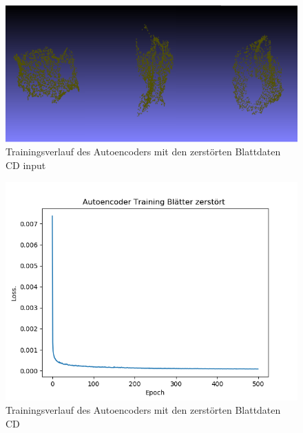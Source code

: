 \documentclass{llncs}
\begin{document}
\begin{figure}[htbp] 
	\centering
	\includegraphics[width=1.2\textwidth]{autoencoder_destroyed_example_chamfer_real.png}
	\caption{Trainingsverlauf des Autoencoders mit den zerstörten Blattdaten CD input }
	\label{fig:Bild43}
\end{figure}

\begin{figure}[htbp] 
	\centering
	\includegraphics[width=1.2\textwidth]{autoencoder_training_bleatter_zer_result.png}
	\caption{Trainingsverlauf des Autoencoders mit den zerstörten Blattdaten CD}
	\label{fig:Bild43}
\end{figure}
\end{document}
